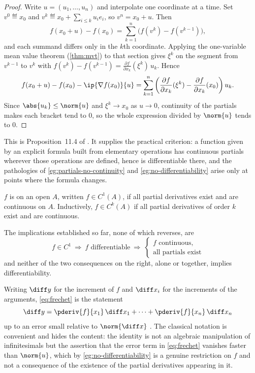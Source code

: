 \begin{proof}
	Write $u=(u_1,\dots,u_n)$ and interpolate one coordinate at a time. Set
	$v^0\eqdef x_0$ and $v^k\eqdef x_0+\sum_{i\leq k}u_ie_i$, so $v^n=x_0+u$. Then
	\[
		f(x_0+u)-f(x_0)=\sum_{k=1}^{n}\bigl(f(v^k)-f(v^{k-1})\bigr),
	\]
	and each summand differs only in the $k$th coordinate. Applying the
	one-variable mean value theorem (\autoref{thm:mvt}) to that section gives
	$\xi^k$ on the segment from $v^{k-1}$ to $v^k$ with
	$f(v^k)-f(v^{k-1})=\frac{\partial f}{\partial x_k}(\xi^k)\,u_k$. Hence
	\[
		f(x_0+u)-f(x_0)-\ip{\nabla f(x_0)}{u}
		=\sum_{k=1}^{n}\left(\frac{\partial f}{\partial x_k}(\xi^k)
		-\frac{\partial f}{\partial x_k}(x_0)\right)u_k .
	\]
	Since $\abs{u_k}\leq\norm{u}$ and $\xi^k\to x_0$ as $u\to0$, continuity of the
	partials makes each bracket tend to $0$, so the whole expression divided by
	$\norm{u}$ tends to $0$.
\end{proof}

This is Proposition~11.4 of \textcite[p.~375]{fukuda2026notes}. It supplies the
practical criterion: a function given by an explicit formula built from
elementary operations has continuous partials wherever those operations are
defined, hence is differentiable there, and the pathologies of
\autoref{eg:partials-no-continuity} and \autoref{eg:no-differentiability} arise
only at points where the formula changes.

\begin{definition}\label{def:c1}
	$f$ is  on an
	open $A$, written $f\in C^1(A)$, if all partial derivatives exist and are
	continuous on $A$. Inductively, $f\in C^k(A)$ if all partial derivatives of
	order $k$ exist and are continuous.
\end{definition}

The implications established so far, none of which reverses, are
\[
	f\in C^1\ \Longrightarrow\ f\text{ differentiable}\ \Longrightarrow\
	\begin{cases}
		f\text{ continuous},                \\
		\text{all partials exist}
	\end{cases}
\]
and neither of the two consequences on the right, alone or together, implies
differentiability.

\begin{remark}\label{rem:total-differential}
	Writing $\diff y$ for the increment of $f$ and $\diff x_i$ for the increments of the
	arguments, \eqref{eq:frechet} is the statement
	\[
		\diff y=\pderiv{f}{x_1}\,\diff x_1+\cdots+
		\pderiv{f}{x_n}\,\diff x_n
	\]
	up to an error small relative to $\norm{\diff x}$
	\autocite[slide 51]{fukuda2026calculus}. The classical notation is convenient
	and hides the content: the identity is not an algebraic manipulation of
	infinitesimals but the assertion that the error term in \eqref{eq:frechet}
	vanishes faster than $\norm{u}$, which by
	\autoref{eg:no-differentiability} is a genuine restriction on $f$ and not a
	consequence of the existence of the partial derivatives appearing in it.
\end{remark}

